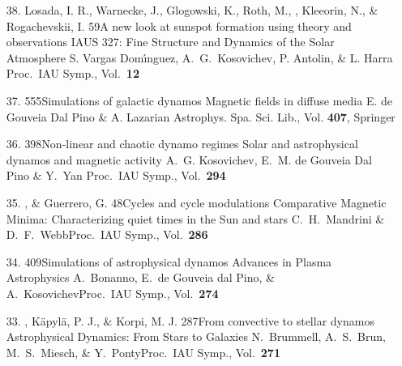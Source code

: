 \begin{itemize}
\item[38.]
Losada, I. R., Warnecke, J., Glogowski, K., Roth, M., \Brandenburg, Kleeorin, N., \& Rogachevskii, I.
{59}{A new look at sunspot formation using theory and observations}
{IAUS 327: Fine Structure and Dynamics of the Solar Atmosphere}
{S. Vargas Dom{\'{\i}}nguez, A.~G.\ Kosovichev, P. Antolin, \& L. Harra}
{Proc.\ IAU Symp., Vol.\ {\bf 12}}

\item[37.]
\Brandenburg{}
{555}{Simulations of galactic dynamos}
{Magnetic fields in diffuse media}
{E. de Gouveia Dal Pino \& A. Lazarian}
{Astrophys. Spa. Sci. Lib., Vol. {\bf 407}, Springer}

\item[36.]
\Brandenburg{}
{398}{Non-linear and chaotic dynamo regimes}
{Solar and astrophysical dynamos and magnetic activity}
{A.\ G. Kosovichev, E.\ M. de Gouveia Dal Pino \& Y.\ Yan}
{Proc.\ IAU Symp., Vol.\ {\bf 294}}

\item[35.]
\Brandenburg, \& Guerrero, G.
{48}{Cycles and cycle modulations}
{Comparative Magnetic Minima: Characterizing quiet times in the Sun and stars}
{C.\ H.\ Mandrini \& D.\ F.\ Webb}{Proc.\ IAU Symp., Vol.\ {\bf 286}}

\item[34.]
\Brandenburg{}
{409}{Simulations of astrophysical dynamos}
{Advances in Plasma Astrophysics}
{A.\ Bonanno, E.\ de Gouveia dal Pino, \& A.\ Kosovichev}{Proc.\ IAU Symp., Vol.\ {\bf 274}}

\item[33.]
\Brandenburg, K\"apyl\"a, P. J., \& Korpi, M. J.
{287}{From convective to stellar dynamos}
{Astrophysical Dynamics: From Stars to Galaxies}
{N.\ Brummell, A.\ S.\ Brun, M.\ S.\ Miesch, \& Y.\ Ponty}{Proc.\ IAU Symp., Vol.\ {\bf 271}}


\end{itemize}
